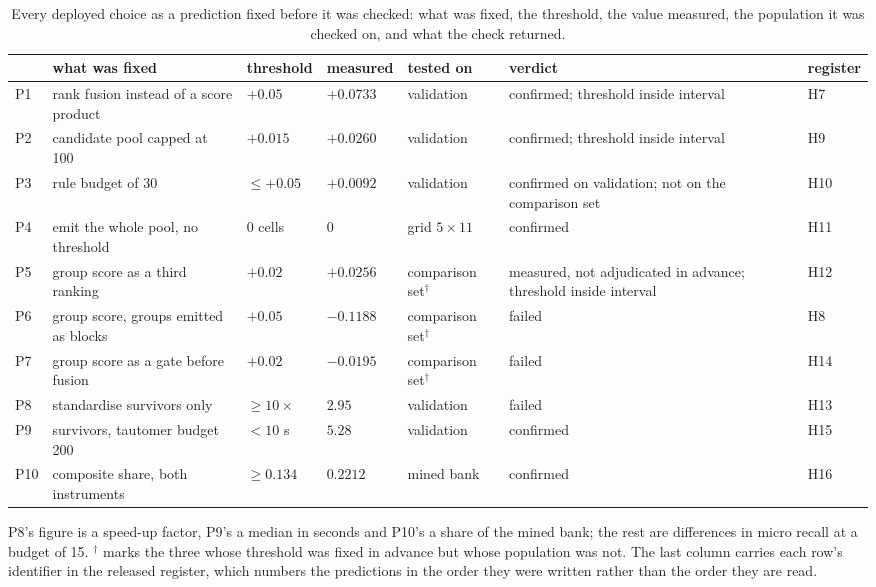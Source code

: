 \begin{table}[t]
\centering\footnotesize
\begin{threeparttable}
\caption{Every deployed choice as a prediction fixed before it was checked: what was fixed, the threshold, the value measured, the population it was checked on, and what the check returned.}
\label{tab:hyp}
\begin{tabular}{@{}lllllp{}l@{}}
\toprule
 & what was fixed & threshold & measured & tested on & verdict & register \\
\midrule
P1 & rank fusion instead of a score product & $+0.05$ & $+0.0733$ & validation & confirmed; threshold inside interval & H7 \\
P2 & candidate pool capped at 100 & $+0.015$ & $+0.0260$ & validation & confirmed; threshold inside interval & H9 \\
P3 & rule budget of 30 & $\le +0.05$ & $+0.0092$ & validation & confirmed on validation; not on the comparison set & H10 \\
P4 & emit the whole pool, no threshold & 0 cells & $0$ & grid $5\times11$ & confirmed & H11 \\
P5 & group score as a third ranking & $+0.02$ & $+0.0256$ & comparison set$^{\dagger}$ & measured, not adjudicated in advance; threshold inside interval & H12 \\
P6 & group score, groups emitted as blocks & $+0.05$ & $-0.1188$ & comparison set$^{\dagger}$ & failed & H8 \\
P7 & group score as a gate before fusion & $+0.02$ & $-0.0195$ & comparison set$^{\dagger}$ & failed & H14 \\
P8 & standardise survivors only & $\ge 10\times$ & $2.95$ & validation & failed & H13 \\
P9 & survivors, tautomer budget 200 & $<10$ s & $5.28$ & validation & confirmed & H15 \\
P10 & composite share, both instruments & $\ge 0.134$ & $0.2212$ & mined bank & confirmed & H16 \\
\bottomrule
\end{tabular}
\begin{tablenotes}[flushleft]\footnotesize
\item P8's figure is a speed-up factor, P9's a median in seconds and P10's a share of the mined bank; the rest are differences in micro recall at a budget of 15. $^{\dagger}$ marks the three whose threshold was fixed in advance but whose population was not. The last column carries each row's identifier in the released register, which numbers the predictions in the order they were written rather than the order they are read.
\end{tablenotes}
\end{threeparttable}
\end{table}
